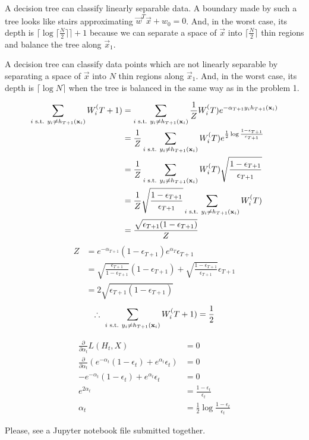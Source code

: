 \documentclass{introtosml}
\newcommand{\x}{\vec{x}}
\newcommand{\w}{\vec{w}}
\newcommand{\sumhi}{\sum_{i \st y_i \ne h_{T+1}(\x_i)}}
\newcommand{\W}[1]{W_i^(#1)}
\newcommand{\e}[1]{\epsilon_{#1}}
\newcommand{\ett}{\e{T+1}}
\begin{document}
\maketitle

\begin{p}
  \item
    A decision tree can classify linearly separable data.
    A boundary made by such a tree looks like stairs
    approximating $\w^T \x + w_0 = 0$.
    And, in the worst case, its depth is
    $\lceil \log \lceil \frac{N}{2} \rceil \rceil + 1$
    because we can separate a space of $\x$
    into $\lceil \frac{N}{2} \rceil$ thin regions
    and balance the tree along $\x_1$.

  \item
    A decision tree can classify data points which are not linearly separable
    by separating a space of $\x$ into $N$ thin regions along $\x_1$.
    And, in the worst case, its depth is $\lceil \log N \rceil$
    when the tree is balanced in the same way as in the problem 1.

  \item
    \begin{align*}
      \sumhi \W{T+1}
      & = \sumhi \frac{1}{Z} \W{T} e^{- \alpha_{T+1} y_i h_{T+1}(\x_i)} \\
      & = \frac{1}{Z} \sumhi \W{T} e^{\frac{1}{2} \log \frac{1 - \ett}{\ett}} \\
      & = \frac{1}{Z} \sumhi \W{T} \sqrt{\frac{1 - \ett}{\ett}} \\
      & = \frac{1}{Z} \sqrt{\frac{1 - \ett}{\ett}} \sumhi \W{T} \\
      & = \frac{\sqrt{\ett (1 - \ett)}}{Z}
    \end{align*}
    \begin{align*}
      Z
      & = e^{- \alpha_{T+1}} (1 - \ett) e^{\alpha_T} \ett \\
      & = \sqrt{\frac{\ett}{1 - \ett}} (1 - \ett)
          + \sqrt{\frac{1 - \ett}{\ett}} \ett \\
      & = 2 \sqrt{\ett (1 - \ett)}
    \end{align*}
    \begin{gather*}
      \therefore \sumhi \W{T+1} = \frac{1}{2}
    \end{gather*}

  \item
    \begin{align*}
      \frac{\partial}{\partial \alpha_t} L(H_t, X) & = 0 \\
      \frac{\partial}{\partial \alpha_t} \left(
        e^{-\alpha_t} (1 - \e{t}) + e^{\alpha_t} \e{t}
      \right) & = 0 \\
      - e^{-\alpha_t} (1 - \e{t}) + e^{\alpha_t} \e{t} & = 0 \\
      e^{2 \alpha_t} & = \frac{1 - \e{t}}{\e{t}} \\
      \alpha_t & = \frac{1}{2} \log \frac{1 - \e{t}}{\e{t}}
    \end{align*}

  \item

  \item
    Please, see a Jupyter notebook file submitted together.
\end{p}
\end{document}
